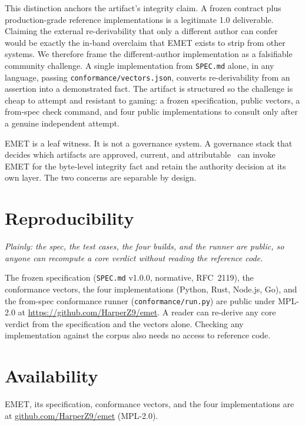 \documentclass[11pt]{article}
\begin{document}
This distinction anchors the artifact's integrity claim. A frozen contract plus production-grade reference implementations is a legitimate 1.0 deliverable. Claiming the external re-derivability that only a different author can confer would be exactly the in-band overclaim that EMET exists to strip from other systems. We therefore frame the different-author implementation as a falsifiable community challenge. A single implementation from \texttt{SPEC.md} alone, in any language, passing \texttt{conformance/vectors.json}, converts re-derivability from an assertion into a demonstrated fact. The artifact is structured so the challenge is cheap to attempt and resistant to gaming: a frozen specification, public vectors, a from-spec check command, and four public implementations to consult only after a genuine independent attempt.

EMET is a leaf witness. It is not a governance system. A governance stack that decides which artifacts are approved, current, and attributable~\cite{contextnest} can invoke EMET for the byte-level integrity fact and retain the authority decision at its own layer. The two concerns are separable by design.

\section{Reproducibility}
\emph{Plainly: the spec, the test cases, the four builds, and the runner are public, so anyone can recompute a core verdict without reading the reference code.}

The frozen specification (\texttt{SPEC.md} v1.0.0, normative, RFC~2119), the conformance vectors, the four implementations (Python, Rust, Node.js, Go), and the from-spec conformance runner (\texttt{conformance/run.py}) are public under MPL-2.0 at \url{https://github.com/HarperZ9/emet}. A reader can re-derive any core verdict from the specification and the vectors alone. Checking any implementation against the corpus also needs no access to reference code.

\section*{Availability}
EMET, its specification, conformance vectors, and the four implementations are at \href{https://github.com/HarperZ9/emet}{github.com/HarperZ9/emet} (MPL-2.0).
\end{document}
